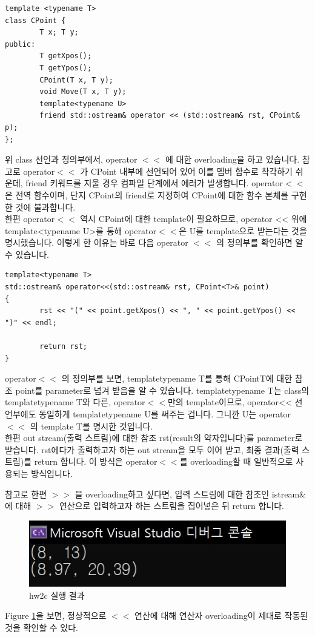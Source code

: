 \documentclass{article}
\begin{document}
\begin{verbatim}
template <typename T>
class CPoint {
    	T x; T y;
public:
    	T getXpos();
    	T getYpos();
    	CPoint(T x, T y);
    	void Move(T x, T y);
    	template<typename U>
    	friend std::ostream& operator << (std::ostream& rst, CPoint& p);
};
\end{verbatim}
위 class 선언과 정의부에서, operator $<<$ 에 대한 overloading을 하고 있습니다. 참고로 operator$<<$ 가 CPoint 내부에 선언되어 있어 이를 멤버 함수로 착각하기 쉬운데, friend 키워드를 지울 경우 컴파일 단계에서 에러가 발생합니다. operator$<<$ 은 전역 함수이며, 단지 CPoint의 friend로 지정하여 CPoint에 대한 함수 본체를 구현한 것에 불과합니다. \\
한편 operator$<<$ 역시 CPoint에 대한 template이 필요하므로, operator << 위에 template<typename U>를 통해 operator$<<$은 U를 template으로 받는다는 것을 명시했습니다. 이렇게 한 이유는 바로 다음 operator $<<$ 의 정의부를 확인하면 알 수 있습니다.
\begin{verbatim}
template<typename T>
std::ostream& operator<<(std::ostream& rst, CPoint<T>& point)
{
    	rst << "(" << point.getXpos() << ", " << point.getYpos() << ")" << endl;
    
    	return rst;
}
\end{verbatim}
operator$<<$ 의 정의부를 보면, template\<typename T\>를 통해 CPoint\<T\>에 대한 참조 point를 parameter로 넘겨 받음을 알 수 있습니다. template\<typename T\>는 class의 template\<typename T\>와 다른, operator$<<$만의 template이므로, operator<< 선언부에도 동일하게 template\<typename U\>를 써주는 겁니다. 그니깐 U는 operator$<<$ 의 template T를 명시한 것입니다.\\
한편 out stream(출력 스트림)에 대한 참조 rst(result의 약자입니다)를 parameter로 받습니다. rst에다가 출력하고자 하는 out stream을 모두 이어 받고, 최종 결과(출력 스트림)를 return 합니다. 이 방식은 operator$<<$를 overloading할 때 일반적으로 사용되는 방식입니다.

참고로 한편 $>>$ 을 overloading하고 싶다면, 입력 스트림에 대한 참조인 istream& 에 대해 $>>$ 연산으로 입력하고자 하는 스트림을 집어넣은 뒤 return 합니다.

\begin{figure} [h]
    \centering
    \includegraphics{hw2c result.jpg}
    \caption{hw2c 실행 결과}
    \label{fig:hw2c result}
\end{figure}
Figure \ref{fig:hw2c result}을 보면, 정상적으로 $<<$ 연산에 대해 연산자 overloading이 제대로 작동된 것을 확인할 수 있다.
\end{document}
